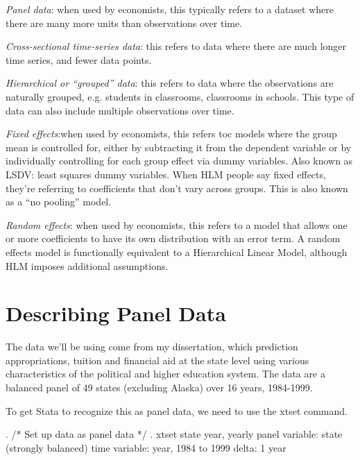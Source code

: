 \documentclass[12pt]{article}
\begin{document}
\begin{description}
\item \emph{Panel data}: when used by economists, this typically
  refers to a dataset where there are many more units than
  observations over time. 


\item \emph{Cross-sectional time-series data}: this refers to data
  where there are much longer time series, and fewer data points. 


\item \emph{Hierarchical or ``grouped'' data}: this refers to data
  where the observations are naturally grouped, e.g. students in
  classrooms, classrooms in schools. This type of data can also
  include multiple observations over time. 


\item \emph{Fixed effects}:when used by economists, this refers toc
  models where the group mean is controlled for, either by subtracting
  it from the dependent variable or by individually controlling for
  each group effect via dummy variables. Also known as LSDV: least
  squares dummy variables. When HLM people say fixed effects, they're
  referring to coefficients that don't vary across groups. This is
  also known as a ``no pooling'' model. 


\item \emph{Random effects}: when used by economists, this refers to a
  model that allows one or more coefficients to have its own
  distribution with an error term. A random effects model is
  functionally equivalent to a Hierarchical Linear Model, although HLM
  imposes additional assumptions. 


\end{description}

\section{Describing Panel Data}

The data we'll be using come from my dissertation, which prediction
appropriations, tuition and financial aid at the state level using
various characteristics of the political and higher education
system. The data are a balanced panel of 49 states (excluding Alaska)
over 16 years, 1984-1999. 

To get Stata to recognize this as panel data, we need to use the xtset
command. 

\begin{stlog}
  . /* Set up data as panel data */
. xtset state year, yearly
       panel variable:  state (strongly balanced)
        time variable:  year, 1984 to 1999
                delta:  1 year
\end{stlog}
\end{document}
